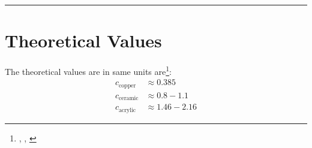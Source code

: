 \documentclass[%
 sor,
 jor,
 amsmath,amssymb,
 reprint,%
]{revtex4-2}
\begin{document}
\noindent\rule{\linewidth}{0.4pt}
\vspace{2cm}
\appendix
\section{Theoretical Values}
The theoretical values are in same units are\footnote{\cite{copper}, \cite{acrylic}, \cite{ceramic}}: 
\[
\begin{split}
c_{\text{copper}} &\approx 0.385\\
c_{\text{ceramic}} &\approx 0.8-1.1\\
c_{\text{acrylic}} &\approx 1.46 - 2.16
\end{split}
\]



\end{document}
